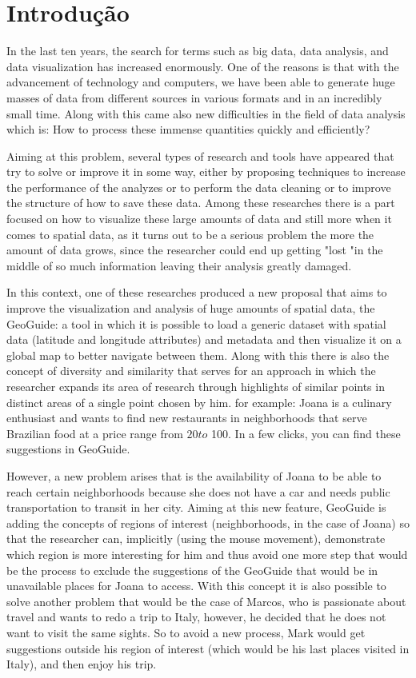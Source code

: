 \chapter{Introdução}


In the last ten years, the search for terms such as big data, data analysis, and
data visualization has increased enormously. One of the reasons is that with the
advancement of technology and computers, we have been able to generate huge masses 
of data from different sources in various formats and in an incredibly small time.
Along with this came also new difficulties in the field of data analysis which is:
How to process these immense quantities quickly and efficiently?

Aiming at this problem, several types of research and tools have appeared that
try to solve or improve it in some way, either by proposing techniques to increase 
the performance of the analyzes or to perform the data cleaning or to improve the 
structure of how to save these data. Among these researches there is a part focused 
on how to visualize these large amounts of data and still more when it comes to 
spatial data, as it turns out to be a serious problem the more the amount of data 
grows, since the researcher could end up getting "lost "in the middle of so much 
information leaving their analysis greatly damaged.

In this context, one of these researches produced a new proposal that aims to 
improve the visualization and analysis of huge amounts of spatial data, the 
GeoGuide: a tool in which it is possible to load a generic dataset with spatial 
data (latitude and longitude attributes) and metadata and then visualize it on a 
global map to better navigate between them. Along with this there is also the 
concept of diversity and similarity that serves for an approach in which the
researcher expands its area of research through highlights of similar points in 
distinct areas of a single point chosen by him. for example: Joana is a culinary
enthusiast and wants to find new restaurants in neighborhoods that serve Brazilian
food at a price range from $20 to $ 100. In a few clicks, you can find these 
suggestions in GeoGuide.

However, a new problem arises that is the availability of Joana to be able to 
reach certain neighborhoods because she does not have a car and needs public 
transportation to transit in her city. Aiming at this new feature, GeoGuide is 
adding the concepts of regions of interest (neighborhoods, in the case of Joana) 
so that the researcher can, implicitly (using the mouse movement), demonstrate 
which region is more interesting for him and thus avoid one more step that would 
be the process to exclude the suggestions of the GeoGuide that would be in unavailable
places for Joana to access. With this concept it is also possible to solve another
problem that would be the case of Marcos, who is passionate about travel and wants
to redo a trip to Italy, however, he decided that he does not want to visit the 
same sights. So to avoid a new process, Mark would get suggestions outside his 
region of interest (which would be his last places visited in Italy), and then 
enjoy his trip.


